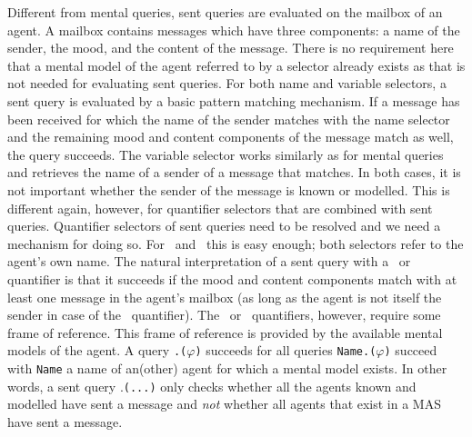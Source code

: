 \documentclass{article}
\begin{document}
Different from mental queries, sent queries are evaluated on the mailbox of an agent. A mailbox contains messages which have three components: a name of the sender, the mood, and the content of the message. There is no requirement here that a mental model of the agent referred to by a selector already exists as that is not needed for evaluating sent queries. For both name and variable selectors, a sent query is evaluated by a basic pattern matching mechanism. If a message has been received for which the name of the sender matches with the name selector and the remaining mood and content components of the message match as well, the query succeeds. The variable selector works similarly as for mental queries and retrieves the name of a sender of a message that matches. In both cases, it is not important whether the sender of the message is known or modelled. This is different again, however, for quantifier selectors that are combined with sent queries. Quantifier selectors of sent queries need to be resolved and we need a mechanism for doing so. For \self\, and \this\, this is easy enough; both selectors refer to the agent's own name. The natural interpretation of a sent query with a \somep\, or \someother\, quantifier is that it succeeds if the mood and content components match with at least one message in the agent's mailbox (as long as the agent is not itself the sender in case of the \someother\, quantifier). The \allp\, or \allother\, quantifiers, however, require some frame of reference. This frame of reference is provided by the available mental models of the agent. A query \texttt{\allother.\sent($\varphi$)} succeeds for all queries \texttt{Name.\sent($\varphi$)} succeed with \texttt{Name} a name of an(other) agent for which a mental model exists. In other words, a sent query \allp.\sent\texttt{(...)} only checks whether all the agents known and modelled have sent a message and \textit{not} whether all agents that exist in a MAS have sent a message.
\end{document}
